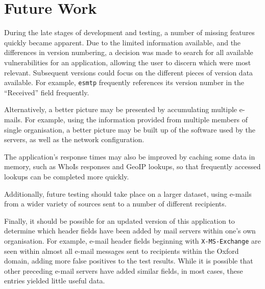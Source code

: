 \section{Future Work}

During the late stages of development and testing, a number of missing features
quickly became apparent. Due to the limited information available, and the
differences in version numbering, a decision was made to search for all
available vulnerabilities for an application, allowing the user to discern
which were most relevant.  Subsequent versions could focus on the different
pieces of version data available.  For example, \texttt{esmtp} frequently
references its version number in the ``Received'' field frequently.

Alternatively, a better picture may be presented by accumulating multiple
e-mails. For example, using the information provided from multiple members of
single organisation, a better picture may be built up of the software used by
the servers, as well as the network configuration.

The application's response times may also be improved by caching some data in
memory, such as WhoIs responses and GeoIP lookups, so that frequently accessed
lookups can be completed more quickly.

Additionally, future testing should take place on a larger dataset, using
e-mails from a wider variety of sources sent to a number of different
recipients.  

Finally, it should be possible for an updated version of this application to
determine which header fields have been added by mail servers within one's own
organisation.  For example, e-mail header fields beginning with
\texttt{X-MS-Exchange} are seen within almost all e-mail messages sent to
recipients within the Oxford domain, adding more false positives to the test
results. While it is possible that other preceding e-mail servers have added
similar fields, in most cases, these entries yielded little useful data.

